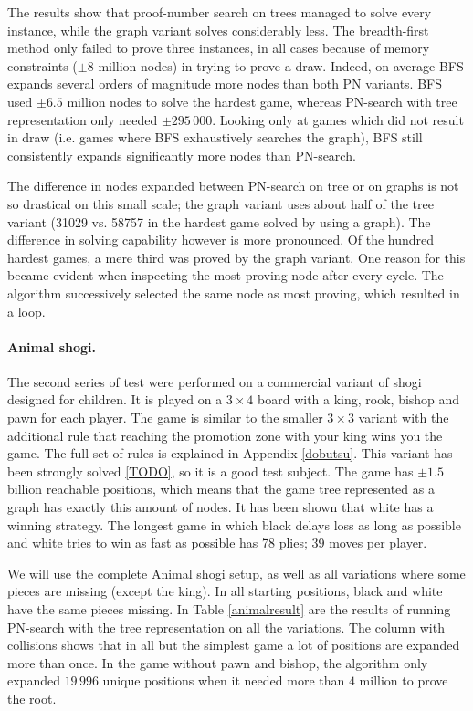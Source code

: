 \documentclass{article}
\begin{document}
The results show that proof-number search on trees managed to solve every instance, while the graph variant solves considerably less. The
breadth-first method only failed to prove three instances, in all cases because of memory constraints ($\pm8$ million nodes) in trying to prove a draw.
Indeed, on average BFS expands several orders of magnitude more nodes than both PN variants. BFS used $\pm6.5$ million nodes to solve the hardest
game, whereas PN-search with tree representation only needed $\pm295\,000$. Looking only at games which did not result in draw (i.e. games where
BFS exhaustively searches the graph), BFS still consistently expands significantly more nodes than PN-search.

The difference in nodes expanded between PN-search on tree or on graphs is not so drastical
on this small scale; the graph variant uses about half of the tree variant (31029 vs. 58757 in the hardest game solved by using a graph).
The difference in solving capability however is more pronounced. Of the hundred hardest games, a mere third was proved by the graph variant.
One reason for this became evident when inspecting the most proving node after every cycle. The algorithm successively selected the same
node as most proving, which resulted in a loop.

\paragraph{Animal shogi.} The second series of test were performed on a commercial variant of shogi designed for children. It is played on a $3 \times 4$
board with a king, rook, bishop and pawn for each player.
The game is similar to the smaller $3 \times 3$ variant with the additional rule that reaching the promotion zone with your king wins you the game.
The full set of rules is explained in Appendix \ref{dobutsu}. This variant has been strongly solved
\ref{TODO}, so it is a good test subject. The game has $\pm1.5$ billion reachable positions, which means that the game tree represented as a graph has exactly
this amount of nodes. It has been shown that white has a winning strategy. The longest game in which black
delays loss as long as possible and white tries to win as fast as possible has 78 plies; 39 moves per player. 

We will use the complete Animal shogi setup, as well as all variations where some pieces are missing (except the king). In all starting positions, black and white have the
same pieces missing. In Table \ref{animalresult} are the results of running PN-search with the tree representation on all the variations. The column with collisions shows that
in all but the simplest game a lot of positions are expanded more than once. In the game without pawn and bishop, the algorithm only expanded $19\,996$ unique positions
when it needed more than $4$ million to prove the root.
\end{document}
